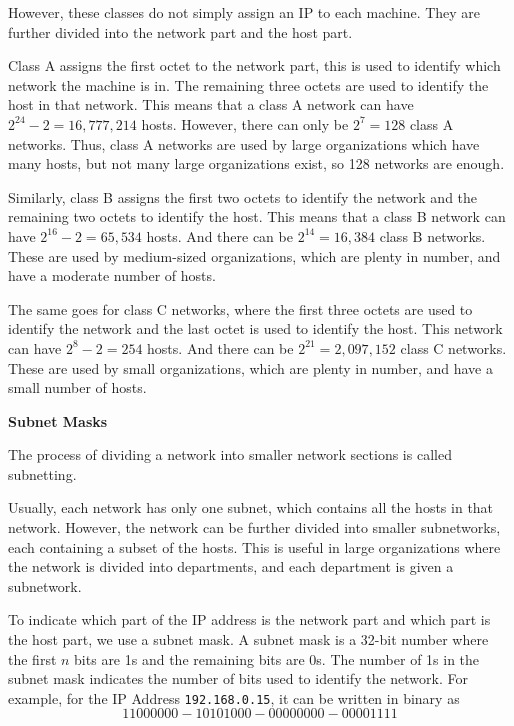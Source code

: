 However, these classes do not simply assign an IP to
each machine. They are further divided into the
network part and the host part.

Class A assigns the first octet to the network part,
this is used to identify which network the machine
is in. The remaining three octets are used to identify
the host in that network. This means that a class A
network can have $2^{24} - 2 = 16,777,214$ hosts.
However, there can only be $2^{7} = 128$ class A
networks. Thus, class A networks are used by large
organizations which have many hosts, but not many
large organizations exist, so 128 networks are enough.

Similarly, class B assigns the first two octets to
identify the network and the remaining two octets
to identify the host. This means that a class B
network can have $2^{16} - 2 = 65,534$ hosts.
And there can be $2^{14} = 16,384$ class B networks.
These are used by medium-sized organizations, which
are plenty in number, and have a moderate number of
hosts.

The same goes for class C networks, where the first
three octets are used to identify the network and
the last octet is used to identify the host. This
network can have $2^{8} - 2 = 254$ hosts. And there
can be $2^{21} = 2,097,152$ class C networks. These
are used by small organizations, which are plenty
in number, and have a small number of hosts.

\textbf{Subnet Masks}

\begin{definition}[Subnetting]
The process of dividing a network into smaller network
sections is called subnetting.
\end{definition}

Usually, each network has only one subnet, which
contains all the hosts in that network. However,
the network can be further divided into smaller
subnetworks, each containing a subset of the hosts.
This is useful in large organizations where the
network is divided into departments, and each
department is given a subnetwork.

To indicate which part of the IP address is the
network part and which part is the host part, we
use a subnet mask. A subnet mask is a 32-bit
number where the first $n$ bits are 1s and the
remaining bits are 0s. The number of 1s in the
subnet mask indicates the number of bits used
to identify the network. For example, for the
IP Address \texttt{192.168.0.15}, it can be
written in binary as
\[
1100 0000 - 1010 1000 - 0000 0000 - 0000 1111
\]

